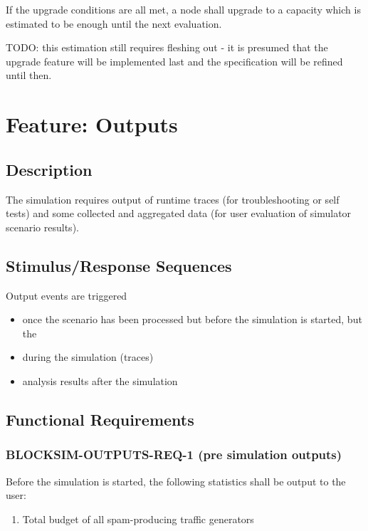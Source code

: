 \documentclass{scrreprt}
\begin{document}
        If the upgrade conditions are all met, a node shall upgrade to a
        capacity which is estimated to be enough until the next evaluation.

        TODO: this estimation still requires fleshing out - it is presumed that
        the upgrade feature will be implemented last and the specification will
        be refined until then.

  \section{Feature: Outputs}

    \subsection{Description}

      The simulation requires output of runtime traces (for troubleshooting or
      self tests) and some collected and aggregated data (for user evaluation
      of simulator scenario results).

    \subsection{Stimulus/Response Sequences}

      Output events are triggered

      \begin{itemize}
        \item once the scenario has been processed but before the
          simulation is started, but the
        \item during the simulation (traces)
        \item analysis results after the simulation
      \end{itemize}

    \subsection{Functional Requirements}

      \subsubsection{BLOCKSIM-OUTPUTS-REQ-1 (pre simulation outputs)}

        Before the simulation is started, the following statistics shall be
        output to the user:

        \begin{enumerate}
          \item Total budget of all spam-producing traffic generators
        \end{enumerate}
\end{document}
